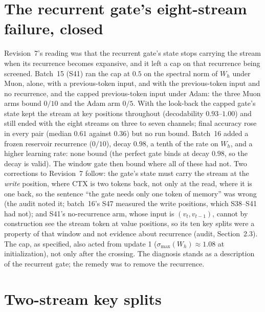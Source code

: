 \documentclass[11pt]{article}
\begin{document}
\section{The recurrent gate's eight-stream failure, closed}
\label{sec:recurrent}

Revision~7's reading was that the recurrent gate's state stops carrying the stream when its recurrence becomes expansive, and it left a cap on that recurrence being screened. Batch~15 (S41) ran the cap at $0.5$ on the spectral norm of $W_h$ under Muon, alone, with a previous-token input, and with the previous-token input and no recurrence, and the capped previous-token input under Adam: the three Muon arms bound $0/10$ and the Adam arm $0/5$. With the look-back the capped gate's state kept the stream at key positions throughout (decodability $0.93$--$1.00$) and still ended with the eight streams on three to seven channels; final accuracy rose in every pair (median $0.61$ against $0.36$) but no run bound. Batch~16 added a frozen reservoir recurrence ($0/10$), decay $0.98$, a tenth of the rate on $W_h$, and a higher learning rate: none bound (the perfect gate binds at decay $0.98$, so the decay is valid). The window gate then bound where all of these had not. Two corrections to Revision~7 follow: the gate's state must carry the stream at the \emph{write} position, where CTX is two tokens back, not only at the read, where it is one back, so the sentence ``the gate needs only one token of memory'' was wrong (the audit noted it; batch~16's S47 measured the write positions, which S38--S41 had not); and S41's no-recurrence arm, whose input is $(v_t, v_{t-1})$, cannot by construction see the stream token at value positions, so its ten key splits were a property of that window and not evidence about recurrence (audit, Section~2.3). The cap, as specified, also acted from update 1 ($\sigma_{\max}(W_h) \approx 1.08$ at initialization), not only after the crossing. The diagnosis stands as a description of the recurrent gate; the remedy was to remove the recurrence.

\section{Two-stream key splits}
\label{sec:keysplits}
\end{document}
